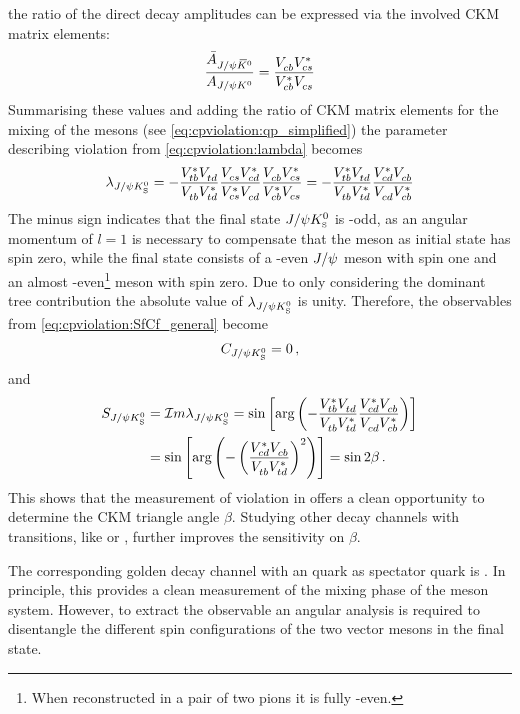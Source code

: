 the ratio of the direct decay amplitudes can be expressed via the involved CKM
matrix elements:
\begin{align}
	\frac{\bar{A}_{J/\psi{\ensuremath{{\kern 0.2em\overline{\kern -0.2em K}{}}{}^0}}}}{A_{J/\psi{\ensuremath{{K}^0}}}} = \frac{{V_{{c}{b}}^{}}{V_{{c}{s}}^\ast}}{{V_{{c}{b}}^\ast}{V_{{c}{s}}^{}}}
\end{align}
Summarising these values and adding the ratio of CKM matrix elements for the
mixing of the \Bd mesons (see \cref{eq:cpviolation:qp_simplified}) the
parameter describing \CP violation from \cref{eq:cpviolation:lambda} becomes
\begin{align}
	\lambda_{J/\psi{\ensuremath{{K}^0_{\mathrm{ \scriptscriptstyle S}}}}} = - \frac{{V_{{t}{b}}^\ast}{V_{{t}{d}}^{}}}{{V_{{t}{b}}^{}}{V_{{t}{d}}^\ast}}\frac{{V_{{c}{s}}^{}}{V_{{c}{d}}^\ast}}{{V_{{c}{s}}^\ast}{V_{{c}{d}}^{}}}\frac{{V_{{c}{b}}^{}}{V_{{c}{s}}^\ast}}{{V_{{c}{b}}^\ast}{V_{{c}{s}}^{}}} = - \frac{{V_{{t}{b}}^\ast}{V_{{t}{d}}^{}}}{{V_{{t}{b}}^{}}{V_{{t}{d}}^\ast}}\frac{{V_{{c}{d}}^\ast}{V_{{c}{b}}^{}}}{{V_{{c}{d}}^{}}{V_{{c}{b}}^\ast}}
\label{eq:lambda_JPsiKS}
\end{align}
The minus sign indicates that the final state $J/\psi{\ensuremath{{K}^0_{\mathrm{ \scriptscriptstyle S}}}}$ is \CP-odd, as an
angular momentum of $l = 1$ is necessary to compensate that the \Bd meson as
initial state has spin zero, while the final state consists of a \CP-even
$J/\psi$ meson with spin one and an almost \CP-even\footnote{When reconstructed
in a pair of two pions it is fully \CP-even.} \KS meson with spin zero. Due to
only considering the dominant tree contribution the absolute value of
$\lambda_{J/\psi{\ensuremath{{K}^0_{\mathrm{ \scriptscriptstyle S}}}}}$ is unity. Therefore, the \CP observables from
\cref{eq:cpviolation:SfCf_general} become
\begin{align}
	C_{J/\psi{\ensuremath{{K}^0_{\mathrm{ \scriptscriptstyle S}}}}} = 0\,,
\end{align}
and
\begin{align}
	S_{J/\psi{\ensuremath{{K}^0_{\mathrm{ \scriptscriptstyle S}}}}} &= \mathcal{I}m\lambda_{J/\psi{\ensuremath{{K}^0_{\mathrm{ \scriptscriptstyle S}}}}}
			 = \sin\left[\text{arg}\left(-\frac{{V_{{t}{b}}^\ast}{V_{{t}{d}}^{}}}{{V_{{t}{b}}^{}}{V_{{t}{d}}^\ast}}\frac{{V_{{c}{d}}^\ast}{V_{{c}{b}}^{}}}{{V_{{c}{d}}^{}}{V_{{c}{b}}^\ast}}\right)\right]\\
			 &= \sin\left[\text{arg}\left(-\left(\frac{{V_{{c}{d}}^\ast}{V_{{c}{b}}^{}}}{{V_{{t}{b}}^{}}{V_{{t}{d}}^\ast}}\right)^2\right)\right]
			 = \sin 2\beta\,.
\end{align}
This shows that the measurement of \CP violation in \BdToJPsiKS offers a clean
opportunity to determine the CKM triangle angle $\beta$. Studying other decay
channels with \bToccbars transitions, like \BdToJPsiKL or \BdToPsiTwoSKS,
further improves the sensitivity on $\beta$.

The corresponding golden decay channel with an \squark quark as spectator
quark is \myBsToJPsiPhi. In principle, this provides a clean measurement of
the mixing phase \phis of the \Bs meson system. However, to extract the \CP
observable an angular analysis is required to disentangle the
different spin configurations of the two vector mesons in the final state.
